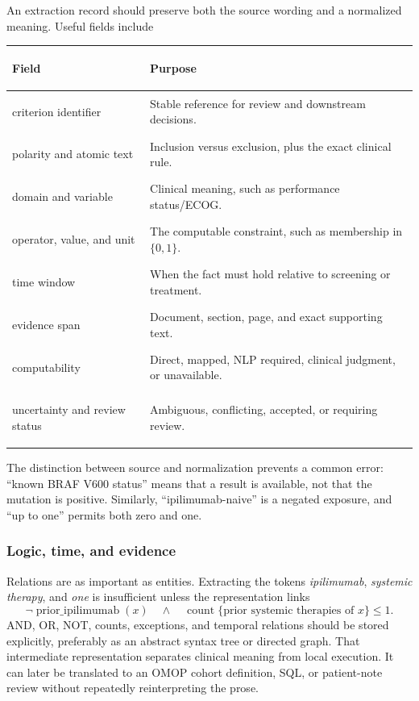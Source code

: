\documentclass[12pt,oneside]{book}
\numberwithin{equation}{section}
\theoremstyle{definition}
\theoremstyle{plain}
\theoremstyle{remark}
\begin{document}
An extraction record should preserve both the source wording and a normalized
meaning.  Useful fields include
\begin{center}
\begin{xltabular}{0.94\textwidth}{>{\bfseries\raggedright\arraybackslash}p{0.27\textwidth}X}
\toprule
Field & Purpose \\
\midrule
criterion identifier & Stable reference for review and downstream decisions. \\
polarity and atomic text & Inclusion versus exclusion, plus the exact clinical rule. \\
domain and variable & Clinical meaning, such as performance status/ECOG. \\
operator, value, and unit & The computable constraint, such as membership in $\{0,1\}$. \\
time window & When the fact must hold relative to screening or treatment. \\
evidence span & Document, section, page, and exact supporting text. \\
computability & Direct, mapped, NLP required, clinical judgment, or unavailable. \\
uncertainty and review status & Ambiguous, conflicting, accepted, or requiring review. \\
\bottomrule
\end{xltabular}
\end{center}
The distinction between source and normalization prevents a common error:
``known BRAF V600 status'' means that a result is available, not that the
mutation is positive.  Similarly, ``ipilimumab-naive'' is a negated exposure,
and ``up to one'' permits both zero and one.

\subsubsection{Logic, time, and evidence}

Relations are as important as entities.  Extracting the tokens
\emph{ipilimumab}, \emph{systemic therapy}, and \emph{one} is insufficient unless
the representation links
\[
  \neg\operatorname{prior\_ipilimumab}(x)
  \quad\land\quad
  \operatorname{count}\{\text{prior systemic therapies of }x\}\le 1.
\]
AND, OR, NOT, counts, exceptions, and temporal relations should be stored
explicitly, preferably as an abstract syntax tree or directed graph.  That
intermediate representation separates clinical meaning from local execution.
It can later be translated to an OMOP cohort definition, SQL, or patient-note
review without repeatedly reinterpreting the prose.
\end{document}
